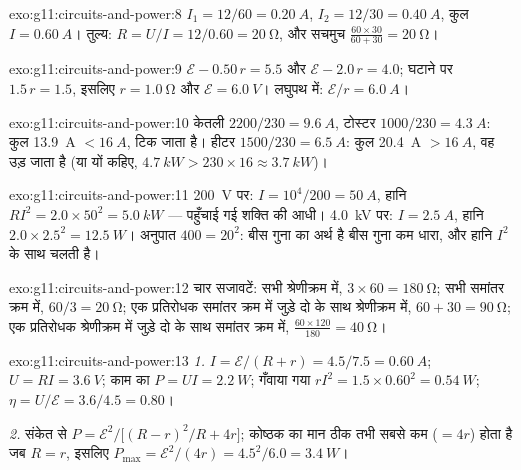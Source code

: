 \begin{solution}{exo:g11:circuits-and-power:8}
$I_1 = 12/60 = \qty{0.20}{A}$, $I_2 = 12/30 = \qty{0.40}{A}$, कुल $I = \qty{0.60}{A}$। तुल्य: $R = U/I = 12/0.60 = \qty{20}{\ohm}$, और सचमुच $\frac{60 \times 30}{60 + 30} = \qty{20}{\ohm}$।
\end{solution}

\begin{solution}{exo:g11:circuits-and-power:9}
$\mathcal{E} - 0.50\,r = 5.5$ और $\mathcal{E} - 2.0\,r = 4.0$; घटाने पर $1.5\,r = 1.5$, इसलिए $r = \qty{1.0}{\ohm}$ और $\mathcal{E} =
\qty{6.0}{V}$। लघुपथ में:
$\mathcal{E}/r = \qty{6.0}{A}$।
\end{solution}

\begin{solution}{exo:g11:circuits-and-power:10}
केतली $2200/230 = \qty{9.6}{A}$, टोस्टर $1000/230 = \qty{4.3}{A}$: कुल \qty{13.9}{A} $< \qty{16}{A}$,  टिक जाता है।
हीटर $1500/230 =
\qty{6.5}{A}$: कुल \qty{20.4}{A} $> \qty{16}{A}$, वह उड़ जाता है (या यों कहिए, $\qty{4.7}{kW} > 230 \times 16 \approx \qty{3.7}{kW}$)।
\end{solution}

\begin{solution}{exo:g11:circuits-and-power:11}
\qty{200}{V} पर: $I = 10^4/200 = \qty{50}{A}$, हानि $RI^2 = 2.0 \times
50^2 = \qty{5.0}{kW}$ --- पहुँचाई गई शक्ति की आधी। \qty{4.0}{kV} पर:
$I =
\qty{2.5}{A}$, हानि $2.0 \times 2.5^2 = \qty{12.5}{W}$। अनुपात $400 =
20^2$: बीस गुना  का अर्थ है बीस
गुना कम धारा, और हानि $I^2$ के साथ चलती है।
\end{solution}

\begin{solution}{exo:g11:circuits-and-power:12}
चार सजावटें: सभी श्रेणीक्रम में, $3 \times 60 = \qty{180}{\ohm}$; सभी समांतर क्रम में, $60/3 = \qty{20}{\ohm}$; एक
प्रतिरोधक समांतर क्रम में जुड़े दो के साथ श्रेणीक्रम में, $60 + 30 = \qty{90}{\ohm}$; एक
प्रतिरोधक श्रेणीक्रम में जुड़े दो के साथ समांतर क्रम में, $\frac{60 \times 120}{180} = \qty{40}{\ohm}$।
\end{solution}

\begin{solution}{exo:g11:circuits-and-power:13}
\emph{1.} $I = \mathcal{E}/(R + r) = 4.5/7.5 = \qty{0.60}{A}$; $U = RI = \qty{3.6}{V}$; काम का $P = UI = \qty{2.2}{W}$; गँवाया गया $rI^2 =
1.5 \times 0.60^2 = \qty{0.54}{W}$; $\eta = U/\mathcal{E} = 3.6/4.5 =
0.80$।

\emph{2.} संकेत से $P = \mathcal{E}^2 \big/ \big[(R - r)^2/R +
4r\big]$; कोष्ठक का मान ठीक तभी सबसे कम ($= 4r$) होता है जब
$R = r$, इसलिए $P_{\max} = \mathcal{E}^2/(4r) = 4.5^2/6.0 = \qty{3.4}{W}$।
\end{solution}

